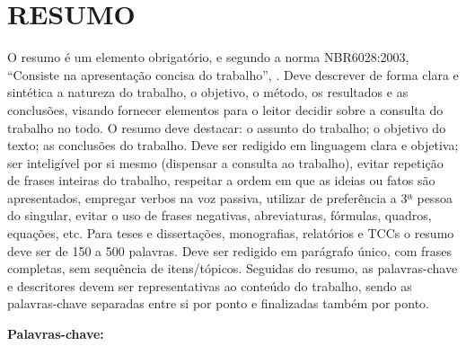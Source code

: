 \chapter*{RESUMO} 
\thispagestyle{empty}
O resumo é um elemento obrigatório, e segundo a norma NBR6028:2003, ``Consiste na apresentação concisa do trabalho'', \cite[p.~1]{NBR6028:2003}. Deve descrever de forma clara e sintética a natureza do trabalho, o objetivo, o método, os resultados e as conclusões, visando fornecer elementos para o leitor decidir sobre a consulta do trabalho no todo. O resumo deve destacar: o assunto do trabalho; o objetivo do texto; as conclusões do trabalho. Deve ser redigido em linguagem clara e objetiva; ser inteligível por si mesmo (dispensar a consulta ao trabalho), evitar repetição de frases inteiras do trabalho, respeitar a ordem em que as ideias ou fatos são apresentados, empregar verbos na voz passiva, utilizar de preferência a 3ª pessoa do singular, evitar o uso de frases negativas, abreviaturas, fórmulas, quadros, equações, etc.
Para teses e dissertações, monografias, relatórios e TCCs o resumo deve ser
de 150 a 500 palavras. Deve ser redigido em parágrafo único, com frases completas,
sem sequência de itens/tópicos. Seguidas do resumo, as palavras-chave e descritores devem ser representativas ao conteúdo do trabalho, sendo as palavras-chave separadas entre si por ponto e finalizadas também por ponto. 
 
 
\vspace{2cm}
{\Large \textbf{Palavras-chave:}}
\vspace{0.4cm}

